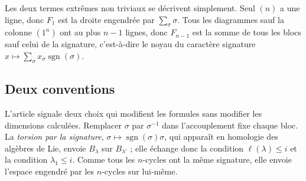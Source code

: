 \documentclass[11pt,a4paper]{amsart}
\theoremstyle{definition}
\theoremstyle{plain}
\theoremstyle{remark}
\newcommand{\sgn}{\operatorname{sgn}}
\begin{document}
Les deux termes extrêmes non triviaux se décrivent simplement. Seul $(n)$ a une ligne, donc $F_1$ est la droite engendrée par $\sum_\sigma \sigma$. Tous les diagrammes sauf la colonne $(1^n)$ ont au plus $n-1$ lignes, donc $F_{n-1}$ est la somme de tous les blocs sauf celui de la signature, c'est-à-dire le noyau du caractère signature $x \mapsto \sum_\sigma x_\sigma \sgn(\sigma)$.

\subsection{Deux conventions}

L'article signale deux choix qui modifient les formules sans modifier les dimensions calculées. Remplacer $\sigma$ par $\sigma^{-1}$ dans l'accouplement fixe chaque bloc. La \emph{torsion par la signature}, $\sigma \mapsto \sgn(\sigma)\sigma$, qui apparaît en homologie des algèbres de Lie, envoie $B_\lambda$ sur $B_{\lambda'}$ ; elle échange donc la condition $\ell(\lambda) \le i$ et la condition $\lambda_1 \le i$. Comme tous les $n$-cycles ont la même signature, elle envoie l'espace engendré par les $n$-cycles sur lui-même.
\end{document}
